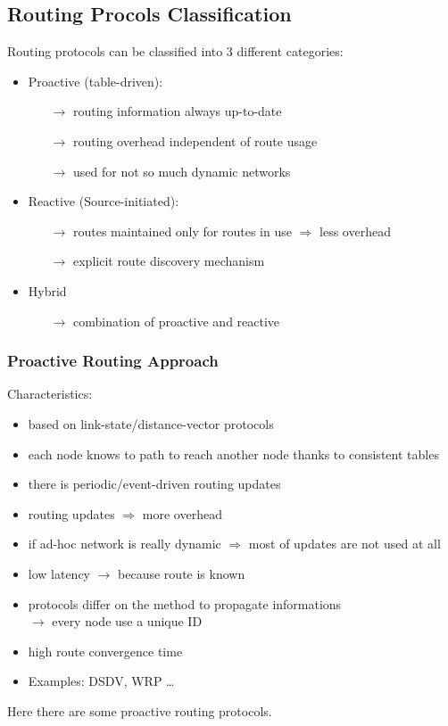 \subsection{Routing Procols Classification}
Routing protocols can be classified into 3 different categories:
\begin{itemize}
    \item Proactive (table-driven):
    \begin{itemize}
        \item[$\rightarrow$] routing information always up-to-date
        \item[$\rightarrow$] routing overhead independent of route usage
        \item[$\rightarrow$] used for not so much dynamic networks 
    \end{itemize}
    \item Reactive (Source-initiated):
    \begin{itemize}
        \item[$\rightarrow$] routes maintained only for routes in use $\Rightarrow$ less overhead
        \item[$\rightarrow$] explicit route discovery mechanism
    \end{itemize}
    \item Hybrid
    \begin{itemize}
        \item[$\rightarrow$] combination of proactive and reactive
    \end{itemize}
\end{itemize}

\subsubsection{Proactive Routing Approach}
Characteristics:
\begin{itemize}
    \item based on link-state/distance-vector protocols
    \item each node knows to path to reach another node thanks to consistent tables
    \item there is periodic/event-driven routing updates
    \item routing updates $\Rightarrow$ more overhead
    \item if ad-hoc network is really dynamic $\Rightarrow$ most of updates are not used at all
    \item low latency $\rightarrow$ because route is known
    \item protocols differ on the method to propagate informations\\$\rightarrow$ every node use a unique ID
    \item high route convergence time
    \item Examples: DSDV, WRP \dots
\end{itemize}
Here there are some proactive routing protocols.

